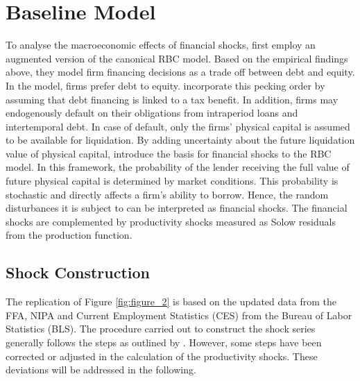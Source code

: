 \section{Baseline Model}
\label{sec:baseline_model}

To analyse the macroeconomic effects of financial shocks, \citeauthor{JERMANNfinancial} first employ an augmented version of the canonical RBC model. Based on the empirical findings above, they model firm financing decisions as a trade off between debt and equity. In the model, firms prefer debt to equity. \citeauthor{JERMANNfinancial} incorporate this pecking order by assuming that debt financing is linked to a tax benefit. In addition, firms may endogenously default on their obligations from intraperiod loans and intertemporal debt. In case of default, only the firms' physical capital is assumed to be available for liquidation. By adding uncertainty about the future liquidation value of physical capital, \citeauthor{JERMANNfinancial} introduce the basis for financial shocks to the RBC model. In this framework, the probability of the lender receiving the full value of future physical capital is determined by market conditions. This probability is stochastic and directly affects a firm's ability to borrow. Hence, the random disturbances it is subject to can be interpreted as financial shocks. The financial shocks are complemented by productivity shocks measured as Solow residuals from the production function.


\subsection{Shock Construction}
\label{sec:shock_construction}



The replication of Figure \ref{fig:figure_2} is based on the updated data from the FFA, NIPA and Current Employment Statistics (CES) from the Bureau of Labor Statistics (BLS). The procedure carried out to construct the shock series generally follows the steps as outlined by \citeauthor{JERMANNfinancial}. However, some steps have been corrected or adjusted in the calculation of the productivity shocks. These deviations will be addressed in the following. 

